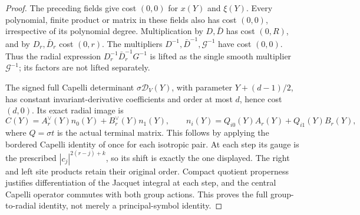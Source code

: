 \begin{proof}
The preceding fields give cost $(0,0)$ for $x(Y)$ and
$\xi(Y)$.  Every polynomial, finite product or matrix in
these fields also has cost $(0,0)$, irrespective of its
polynomial degree.  Multiplication by $D,\bar D$ has cost
$(0,R)$, and by $D_r,\bar D_r$ cost $(0,r)$.
The multipliers $D^{-1},\bar D^{-1},\mathcal G^{-1}$ have
cost $(0,0)$.  Thus the radial expression
$D_r^{-1}\bar D_r^{-1}G^{-1}$ is lifted as the single
smooth multiplier $\mathcal G^{-1}$; its factors are not
lifted separately.

The signed full Capelli determinant
$\sigma\mathcal D_V(Y)$, with parameter $Y+(d-1)/2$,
has constant invariant-derivative coefficients and order at
most $d$, hence cost $(d,0)$.  Its exact radial image is
\begin{equation}\label{actual-top-lift-central}
 C(Y)=A_r^\vee(Y)n_0(Y)+B_r^\vee(Y)n_1(Y),\qquad
 n_i(Y)=Q_{i0}(Y)A_r(Y)+Q_{i1}(Y)B_r(Y),
\end{equation}
where $Q=\sigma t$ is the actual terminal matrix.  This
follows by applying the bordered Capelli identity of
once for each isotropic pair.
At each step its gauge is the prescribed
$|c_j|^{2(r-j)+k}$, so its shift is exactly the one displayed.
The right and left site products retain their original
order.  Compact quotient properness justifies differentiation
of the Jacquet integral at each step, and the central
Capelli operator commutes with both group actions.
This proves the full group-to-radial identity, not merely a
principal-symbol identity.\cite{top-lift-generators-source}


\end{proof}
